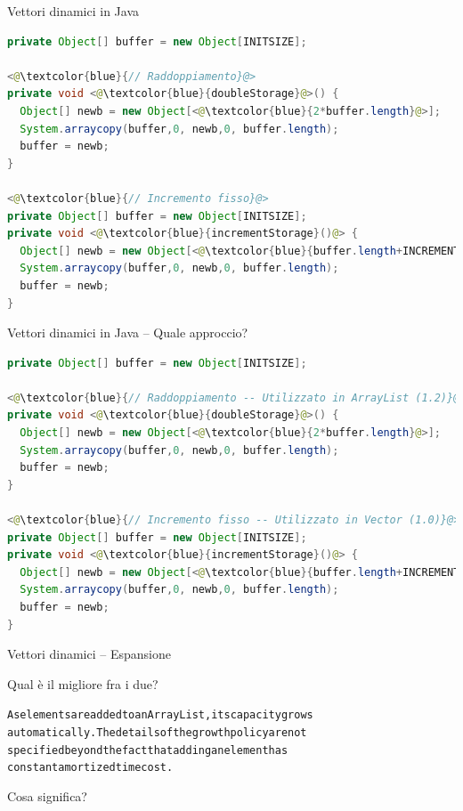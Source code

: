 \begin{frame}{Vettori dinamici in Java}

\begin{lstlisting}[language=java]
private Object[] buffer = new Object[INITSIZE];

<@\textcolor{blue}{// Raddoppiamento}@>
private void <@\textcolor{blue}{doubleStorage}@>() {
  Object[] newb = new Object[<@\textcolor{blue}{2*buffer.length}@>];
  System.arraycopy(buffer,0, newb,0, buffer.length);
  buffer = newb;
}

<@\textcolor{blue}{// Incremento fisso}@>
private Object[] buffer = new Object[INITSIZE];
private void <@\textcolor{blue}{incrementStorage}()@> {
  Object[] newb = new Object[<@\textcolor{blue}{buffer.length+INCREMENT}@>];
  System.arraycopy(buffer,0, newb,0, buffer.length);
  buffer = newb;
}
\end{lstlisting}
	
\end{frame}

\begin{frame}{Vettori dinamici in Java -- Quale approccio?}

\begin{lstlisting}[language=java]
private Object[] buffer = new Object[INITSIZE];

<@\textcolor{blue}{// Raddoppiamento -- Utilizzato in ArrayList (1.2)}@>
private void <@\textcolor{blue}{doubleStorage}@>() {
  Object[] newb = new Object[<@\textcolor{blue}{2*buffer.length}@>];
  System.arraycopy(buffer,0, newb,0, buffer.length);
  buffer = newb;
}

<@\textcolor{blue}{// Incremento fisso -- Utilizzato in Vector (1.0)}@>
private Object[] buffer = new Object[INITSIZE];
private void <@\textcolor{blue}{incrementStorage}()@> {
  Object[] newb = new Object[<@\textcolor{blue}{buffer.length+INCREMENT}@>];
  System.arraycopy(buffer,0, newb,0, buffer.length);
  buffer = newb;
}
\end{lstlisting}

\end{frame}


\begin{frame}[fragile]{Vettori dinamici -- Espansione}

\begin{myboxtitle}[Domanda]
Qual è il migliore fra i due?
\end{myboxtitle}

\begin{myboxtitle}
\begin{alltt}
As elements are added to an \alert{ArrayList}, its capacity grows 
automatically. The details of the growth policy are not 
specified beyond the fact that adding an element has 
\alert{constant} amortized time cost.
\end{alltt}
\end{myboxtitle}

\begin{myboxtitle}[Domanda]
Cosa significa?
\end{myboxtitle}

\end{frame}

